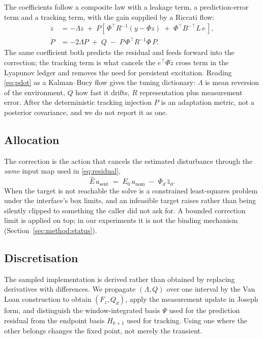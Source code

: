 The coefficients follow a composite law with a leakage term, a prediction-error
term and a tracking term, with the gain supplied by a Riccati flow:
\begin{align}
\dot z &= -\Lambda z \;+\; P\!\left[\,\Phi^\top R^{-1}\!\left(y-\Phi z\right)
        \;+\; \Phi^\top B^{-\top} L\,e \,\right], \label{eq:zdot}\\
\dot P &= -2\Lambda P \;+\; Q \;-\; P\,\Phi^\top R^{-1}\Phi\,P . \label{eq:pdot}
\end{align}
The same coefficient both predicts the residual and feeds forward into the
correction; the tracking term is what cancels the $e^\top\Phi\tilde z$ cross term
in the Lyapunov ledger and removes the need for persistent excitation. Reading
\eqref{eq:pdot} as a Kalman--Bucy flow gives the tuning dictionary: $\Lambda$ is
mean reversion of the environment, $Q$ how fast it drifts, $R$ representation plus
measurement error. After the deterministic tracking injection $P$ is an adaptation
metric, not a posterior covariance, and we do not report it as one.

\subsection{Allocation}\label{sec:method:allocation}

The correction is the action that cancels the estimated disturbance through the
\emph{same} input map used in \eqref{eq:residual},
\begin{equation}
\hat E\,a_{\mathrm{sent}} \;=\; E_0\,a_{\mathrm{nom}} \;-\; \Phi_d\,\hat z_d .
\label{eq:allocate}
\end{equation}
When the target is not reachable the solve is a constrained least-squares problem
under the interface's box limits, and an infeasible target raises rather than
being silently clipped to something the caller did not ask for. A bounded
correction limit is applied on top; in our experiments it is not the binding
mechanism (Section~\ref{sec:method:status}).

\subsection{Discretisation}\label{sec:method:discrete}

The sampled implementation is derived rather than obtained by replacing
derivatives with differences. We propagate $(\Lambda,Q)$ over one interval by the
Van Loan construction to obtain $(F_z,Q_d)$, apply the measurement update in
Joseph form, and distinguish the window-integrated basis $\Psi$ used for the
prediction residual from the endpoint basis $H_{k+1}$ used for tracking. Using one
where the other belongs changes the fixed point, not merely the transient.

